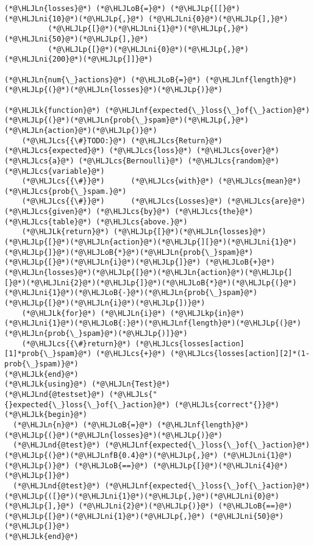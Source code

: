\documentclass[12pt,a4paper]{article}
\newcommand{\HLJLk}[1]{\textcolor[RGB]{148,91,176}{\textbf{#1}}}
\newcommand{\HLJLkp}[1]{\textcolor[RGB]{148,91,176}{\textbf{#1}}}
\newcommand{\HLJLn}[1]{#1}
\newcommand{\HLJLnd}[1]{\textcolor[RGB]{214,102,97}{#1}}
\newcommand{\HLJLnf}[1]{\textcolor[RGB]{66,102,213}{#1}}
\newcommand{\HLJLs}[1]{\textcolor[RGB]{201,61,57}{#1}}
\newcommand{\HLJLnfB}[1]{\textcolor[RGB]{59,151,46}{#1}}
\newcommand{\HLJLni}[1]{\textcolor[RGB]{59,151,46}{#1}}
\newcommand{\HLJLoB}[1]{\textcolor[RGB]{102,102,102}{\textbf{#1}}}
\newcommand{\HLJLp}[1]{#1}
\newcommand{\HLJLcs}[1]{\textcolor[RGB]{153,153,119}{\textit{#1}}}
\begin{document}
\begin{lstlisting}
(*@\HLJLn{losses}@*) (*@\HLJLoB{=}@*) (*@\HLJLp{[[}@*)(*@\HLJLni{10}@*)(*@\HLJLp{,}@*) (*@\HLJLni{0}@*)(*@\HLJLp{],}@*)
          (*@\HLJLp{[}@*)(*@\HLJLni{1}@*)(*@\HLJLp{,}@*) (*@\HLJLni{50}@*)(*@\HLJLp{],}@*)
          (*@\HLJLp{[}@*)(*@\HLJLni{0}@*)(*@\HLJLp{,}@*) (*@\HLJLni{200}@*)(*@\HLJLp{]]}@*)

(*@\HLJLn{num{\_}actions}@*) (*@\HLJLoB{=}@*) (*@\HLJLnf{length}@*)(*@\HLJLp{(}@*)(*@\HLJLn{losses}@*)(*@\HLJLp{)}@*)

(*@\HLJLk{function}@*) (*@\HLJLnf{expected{\_}loss{\_}of{\_}action}@*)(*@\HLJLp{(}@*)(*@\HLJLn{prob{\_}spam}@*)(*@\HLJLp{,}@*) (*@\HLJLn{action}@*)(*@\HLJLp{)}@*)
    (*@\HLJLcs{{\#}TODO:}@*) (*@\HLJLcs{Return}@*) (*@\HLJLcs{expected}@*) (*@\HLJLcs{loss}@*) (*@\HLJLcs{over}@*) (*@\HLJLcs{a}@*) (*@\HLJLcs{Bernoulli}@*) (*@\HLJLcs{random}@*) (*@\HLJLcs{variable}@*)
    (*@\HLJLcs{{\#}}@*)      (*@\HLJLcs{with}@*) (*@\HLJLcs{mean}@*) (*@\HLJLcs{prob{\_}spam.}@*)
    (*@\HLJLcs{{\#}}@*)      (*@\HLJLcs{Losses}@*) (*@\HLJLcs{are}@*) (*@\HLJLcs{given}@*) (*@\HLJLcs{by}@*) (*@\HLJLcs{the}@*) (*@\HLJLcs{table}@*) (*@\HLJLcs{above.}@*)
    (*@\HLJLk{return}@*) (*@\HLJLp{[}@*)(*@\HLJLn{losses}@*)(*@\HLJLp{[}@*)(*@\HLJLn{action}@*)(*@\HLJLp{][}@*)(*@\HLJLni{1}@*)(*@\HLJLp{]}@*)(*@\HLJLoB{*}@*)(*@\HLJLn{prob{\_}spam}@*)(*@\HLJLp{[}@*)(*@\HLJLn{i}@*)(*@\HLJLp{]}@*) (*@\HLJLoB{+}@*) (*@\HLJLn{losses}@*)(*@\HLJLp{[}@*)(*@\HLJLn{action}@*)(*@\HLJLp{][}@*)(*@\HLJLni{2}@*)(*@\HLJLp{]}@*)(*@\HLJLoB{*}@*)(*@\HLJLp{(}@*)(*@\HLJLni{1}@*)(*@\HLJLoB{-}@*)(*@\HLJLn{prob{\_}spam}@*)(*@\HLJLp{[}@*)(*@\HLJLn{i}@*)(*@\HLJLp{])}@*)
    (*@\HLJLk{for}@*) (*@\HLJLn{i}@*) (*@\HLJLkp{in}@*) (*@\HLJLni{1}@*)(*@\HLJLoB{:}@*)(*@\HLJLnf{length}@*)(*@\HLJLp{(}@*)(*@\HLJLn{prob{\_}spam}@*)(*@\HLJLp{)]}@*)
    (*@\HLJLcs{{\#}return}@*) (*@\HLJLcs{losses[action][1]*prob{\_}spam}@*) (*@\HLJLcs{+}@*) (*@\HLJLcs{losses[action][2]*(1-prob{\_}spam)}@*)
(*@\HLJLk{end}@*)
(*@\HLJLk{using}@*) (*@\HLJLn{Test}@*)
(*@\HLJLnd{@testset}@*) (*@\HLJLs{"{}expected{\_}loss{\_}of{\_}action}@*) (*@\HLJLs{correct"{}}@*) (*@\HLJLk{begin}@*)
  (*@\HLJLn{n}@*) (*@\HLJLoB{=}@*) (*@\HLJLnf{length}@*)(*@\HLJLp{(}@*)(*@\HLJLn{losses}@*)(*@\HLJLp{)}@*)
  (*@\HLJLnd{@test}@*) (*@\HLJLnf{expected{\_}loss{\_}of{\_}action}@*)(*@\HLJLp{(}@*)(*@\HLJLnfB{0.4}@*)(*@\HLJLp{,}@*) (*@\HLJLni{1}@*)(*@\HLJLp{)}@*) (*@\HLJLoB{==}@*) (*@\HLJLp{[}@*)(*@\HLJLni{4}@*)(*@\HLJLp{]}@*)
  (*@\HLJLnd{@test}@*) (*@\HLJLnf{expected{\_}loss{\_}of{\_}action}@*)(*@\HLJLp{([}@*)(*@\HLJLni{1}@*)(*@\HLJLp{,}@*)(*@\HLJLni{0}@*)(*@\HLJLp{],}@*) (*@\HLJLni{2}@*)(*@\HLJLp{)}@*) (*@\HLJLoB{==}@*) (*@\HLJLp{[}@*)(*@\HLJLni{1}@*)(*@\HLJLp{,}@*) (*@\HLJLni{50}@*)(*@\HLJLp{]}@*)
(*@\HLJLk{end}@*)
\end{lstlisting}
\end{document}

